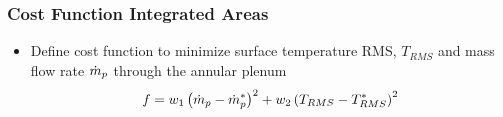 \documentclass{beamer}
\begin{document}
\begin{frame}
  \frametitle{Cost Function Integrated Areas}
  \vspace{-0.8cm}
  \begin{figure}[h]
    \centering
  \end{figure}
  \vspace{-0.2cm}
  \begin{itemize}
    \item Define cost function to minimize surface temperature RMS,
      $T_{RMS}$ and mass flow rate $\dot{m}_p$ through the annular plenum
      \[
        f = w_1\left( \dot{m}_p - \dot{m}_p^* \right)^2 
          + w_2\left( T_{RMS} - T_{RMS}^*\right)^2
      \]
  \end{itemize}
\end{frame}
\end{document}
